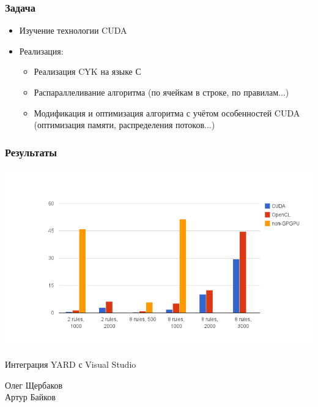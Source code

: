 \documentclass{beamer}
\begin{document}
\begin{frame}
	\transwipe[direction=90]
	\frametitle{Задача}
	\begin{itemize}
        \item Изучение технологии CUDA
        \item Реализация:
    	\begin{itemize}
            \item Реализация CYK на языке С
            \item Распараллеливание алгоритма (по ячейкам в строке, по правилам...)
            \item Модификация и оптимизация алгоритма с учётом особенностей CUDA (оптимизация памяти, распределения потоков...)
        \end{itemize}

    \end{itemize}
\end{frame}    


\begin{frame}
	\transwipe[direction=90]
	\frametitle{Результаты}
	\begin{center}
        {\includegraphics[width=\textwidth, height=0.9\textheight]{diagrams/CYKPerformance.pdf}}
    \end{center}
\end{frame}    


\author[Олег Щербаков, Артур Байков]{}

\begin{frame}
	\transwipe[direction=90]
	\begin{block}{}
	    \begin{center}
	        \huge{Интеграция YARD с Visual Studio}
	    \end{center}
	\end{block}
	\begin{center}
	    \huge
	        {Олег Щербаков
	        \\
            Артур Байков}
	\end{center}
\end{frame}
\end{document}
